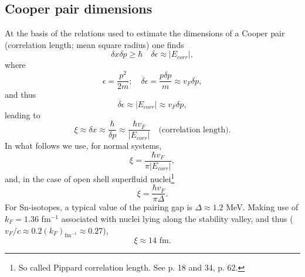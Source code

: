 \subsection{Cooper pair dimensions}\label{S3.4.1}
 At the basis of the relations used to estimate  the dimensions of a Cooper pair (correlation length; mean square radius) one finds 
\begin{equation}
\delta x\delta p\ge \hbar\quad \delta\epsilon\approx |E_{corr}|,
\end{equation}
where
\begin{equation}
\epsilon=\frac{p^2}{2m};\quad\delta\epsilon=\frac{p\delta p}{m}\approx v_F\delta p,
\end{equation}
and thus 
\begin{equation}
\delta\epsilon\approx  |E_{corr}|\approx v_F\delta p,
\end{equation}
leading to
\begin{equation}\label{eq3.4.9}
\xi\approx\delta x\approx\frac{\hbar}{\delta p}\approx \frac{\hbar v_F}{ |E_{corr}|}\quad \text{(correlation length)}.
\end{equation}
In what follows we use, for normal systems, 
\begin{equation}
\xi=\frac{\hbar v_F}{ \pi|E_{corr}|},
\end{equation}
and, in the case of open shell superfluid nuclei\footnote{So called Pippard correlation length. See \cite{Schrieffer:64} p. 18 and 34,  \cite{Annett:13} p. 62.}
\begin{equation}\label{eq4.5.11}
\xi=\frac{\hbar v_F}{ \pi\Delta}.
\end{equation}
For Sn-isotopes, a typical value of the pairing gap is $\Delta\approx 1.2$ MeV. Making use of $k_F=1.36$ fm$^{-1}$ associated with nuclei lying along the stability valley, and thus ($v_F/c\approx 0.2 (k_F)_{\text{fm}^{-1}}\approx0.27$),
\begin{equation}
\xi\approx14\text{ fm}.
\end{equation}
